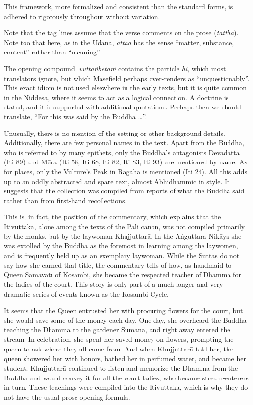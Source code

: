 \documentclass[12pt,openany]{book}%
\begin{document}
This framework, more formalized and consistent than the standard forms, is adhered to rigorously throughout without variation.

Note that the tag lines assume that the verse comments on the prose (\emph{tattha}). Note too that here, as in the \textsanskrit{Udāna}, \emph{attha} has the sense “matter, substance, content” rather than “meaning”.

The opening compound, \emph{\textsanskrit{vuttañhetaṁ}} contains the particle \emph{hi}, which most translators ignore, but which Masefield perhaps over-renders as “unquestionably”. This exact idiom is not used elsewhere in the early texts, but it is quite common in the Niddesa, where it seems to act as a logical connection. A doctrine is stated, and it is supported with additional quotations. Perhaps then we should translate, “For this was said by the Buddha …”.

Unusually, there is no mention of the setting or other background details. Additionally, there are few personal names in the text. Apart from the Buddha, who is referred to by many epithets, only the Buddha’s antagonists Devadatta (Iti 89) and \textsanskrit{Māra} (Iti 58, Iti 68, Iti 82, Iti 83, Iti 93) are mentioned by name. As for places, only the Vulture’s Peak in \textsanskrit{Rāgaha} is mentioned (Iti 24). All this adds up to an oddly abstracted and spare text, almost Abhidhammic in style. It suggests that the collection was compiled from reports of what the Buddha said rather than from first-hand recollections.

This is, in fact, the position of the commentary, which explains that the Itivuttaka, alone among the texts of the Pali canon, was not compiled primarily by the monks, but by the laywoman \textsanskrit{Khujjuttarā}. In the \textsanskrit{Aṅguttara} \textsanskrit{Nikāya} she was extolled by the Buddha as the foremost in learning among the laywomen, and is frequently held up as an exemplary laywoman. While the Suttas do not say how she earned that title, the commentary tells of how, as handmaid to Queen \textsanskrit{Sāmāvatī} of Kosambi, she became the respected teacher of Dhamma for the ladies of the court. This story is only part of a much longer and very dramatic series of events known as the Kosambi Cycle.

It seems that the Queen entrusted her with procuring flowers for the court, but she would save some of the money each day. One day, she overheard the Buddha teaching the Dhamma to the gardener Sumana, and right away entered the stream. In celebration, she spent her saved money on flowers, prompting the queen to ask where they all came from. And when \textsanskrit{Khujjuttarā} told her, the queen showered her with honors, bathed her in perfumed water, and became her student. \textsanskrit{Khujjuttarā} continued to listen and memorize the Dhamma from the Buddha and would convey it for all the court ladies, who became stream-enterers in turn. These teachings were compiled into the Itivuttaka, which is why they do not have the usual prose opening formula.
\end{document}

